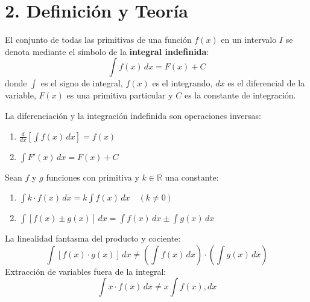 \documentclass[11pt]{article}
\newenvironment{teoria}{\section*{2. Definición y Teoría}}{}
\newenvironment{definicion}[1]{\begin{tcolorbox}[colback=blue!5,colframe=blue!75!black,title=Definición: #1]}{\end{tcolorbox}}
\newenvironment{teorema}[1]{\begin{tcolorbox}[colback=green!5,colframe=green!75!black,title=Teorema: #1]}{\end{tcolorbox}}
\newenvironment{procesamiento}[1]{\begin{tcolorbox}[colback=gray!10,colframe=gray!75!black,title=Trampa Cognitiva: #1]}{\end{tcolorbox}}
\begin{document}
\begin{teoria}
  \begin{definicion}{Notación de la Integral Indefinida}
    El conjunto de todas las primitivas de una función $f(x)$ en un intervalo $I$ se denota mediante el símbolo de la \textbf{integral indefinida}:
    \[ \int f(x) \, dx = F(x) + C \]
    donde $\int$ es el signo de integral, $f(x)$ es el integrando, $dx$ es el diferencial de la variable, $F(x)$ es una primitiva particular y $C$ es la constante de integración.
  \end{definicion}

  \begin{teorema}{Cancelación Mutua entre Derivada e Integral}
    La diferenciación y la integración indefinida son operaciones inversas:
    \begin{enumerate}
      \item $\displaystyle \frac{d}{dx} \left[ \int f(x) \, dx \right] = f(x)$
      \item $\displaystyle \int F'(x) \, dx = F(x) + C$
    \end{enumerate}
  \end{teorema}

  \begin{teorema}{Linealidad de la Integral Indefinida}
    Sean $f$ y $g$ funciones con primitiva y $k \in \mathbb{R}$ una constante:
    \begin{enumerate}
      \item $\displaystyle \int k \cdot f(x) \, dx = k \int f(x) \, dx \quad (k \neq 0)$
      \item $\displaystyle \int [f(x) \pm g(x)] \, dx = \int f(x) \, dx \pm \int g(x) \, dx$
    \end{enumerate}
  \end{teorema}

  \begin{procesamiento}{Falacias de Linealidad}
    La linealidad fantasma del producto y cociente:
    \[ \int [f(x) \cdot g(x)] \, dx \neq \left(\int f(x) \, dx\right) \cdot \left(\int g(x) \, dx\right) \]
    Extracción de variables fuera de la integral:
    \[ \int x \cdot f(x) \, dx \neq x \int f(x) , dx \]
  \end{procesamiento}

\end{teoria}
\end{document}
